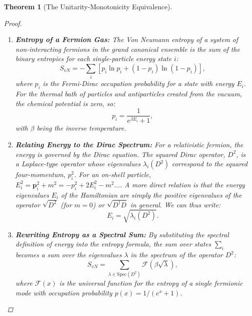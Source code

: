 \documentclass[11pt, letterpaper]{report}
\theoremstyle{plain} %
\newtheorem{theorem}{Theorem}[chapter]
\theoremstyle{definition} %
\theoremstyle{remark} %
\begin{document}
\begin{theorem}[The Unitarity-Monotonicity Equivalence]
\begin{proof}
\begin{enumerate}
    \item \textbf{Entropy of a Fermion Gas:} The Von Neumann entropy of a system of non-interacting fermions in the grand canonical ensemble is the sum of the binary entropies for each single-particle energy state $i$:
    \begin{equation}
        S_{vN} = -\sum_i \left[ p_i \ln p_i + (1-p_i) \ln(1-p_i) \right],
    \end{equation}
    where $p_i$ is the Fermi-Dirac occupation probability for a state with energy $E_i$. For the thermal bath of particles and antiparticles created from the vacuum, the chemical potential is zero, so:
    \begin{equation}
        p_i = \frac{1}{e^{\beta E_i} + 1},
    \end{equation}
    with $\beta$ being the inverse temperature.

    \item \textbf{Relating Energy to the Dirac Spectrum:} For a relativistic fermion, the energy is governed by the Dirac equation. The squared Dirac operator, $D^2$, is a Laplace-type operator whose eigenvalues $\lambda_i(D^2)$ correspond to the squared four-momentum, $p_i^2$. For an on-shell particle, $E_i^2 = \mathbf{p}_i^2 + m^2 = -p_i^2 + 2E_i^2 - m^2 \dots$. A more direct relation is that the energy eigenvalues $E_i$ of the Hamiltonian are simply the positive eigenvalues of the operator $\sqrt{D^2}$ (for $m=0$) or $\sqrt{D^\dagger D}$ in general. We can thus write:
    \begin{equation}
        E_i = \sqrt{\lambda_i(D^2)}.
    \end{equation}

    \item \textbf{Rewriting Entropy as a Spectral Sum:} By substituting the spectral definition of energy into the entropy formula, the sum over states $\sum_i$ becomes a sum over the eigenvalues $\lambda$ in the spectrum of the operator $D^2$:
    \begin{equation}
        S_{vN} = \sum_{\lambda \in \text{Spec}(D^2)} \mathcal{F}(\beta\sqrt{\lambda}),
    \end{equation}
    where $\mathcal{F}(x)$ is the universal function for the entropy of a single fermionic mode with occupation probability $p(x) = 1/(e^x+1)$.


\end{enumerate}
\end{proof}
\end{theorem}
\end{document}
